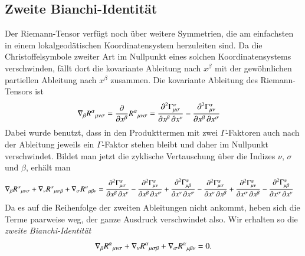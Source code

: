 \subsection{Zweite Bianchi-Identität}
Der Riemann-Tensor verfügt noch über weitere Symmetrien, die am
einfachsten in einem lokalgeodätischen Koordinatensystem herzuleiten sind. 
Da die Christoffelsymbole zweiter Art im Nullpunkt eines solchen
Koordinatensystems verschwinden, fällt dort die kovariante Ableitung
nach $x^\beta$ mit der gewöhnlichen partiellen Ableitung nach $x^\beta$
zusammen.
Die kovariante Ableitung des Riemann-Tensors ist
\begin{align*}
\nabla_\beta
R^\alpha\mathstrut_{\mu\nu\sigma}
&=
\frac{\partial}{\partial x^\beta}
R^\alpha\mathstrut_{\mu\nu\sigma}
=
\frac{\partial^2\Gamma^\alpha_{\mu\sigma}}{\partial x^\beta\,\partial x^\nu}
-
\frac{\partial^2\Gamma^\alpha_{\mu\nu}}{\partial x^\beta\,\partial x^\sigma}
\end{align*}
Dabei wurde benutzt, dass in den Produkttermen mit zwei $\Gamma$-Faktoren
auch nach der Ableitung jeweils ein $\Gamma$-Faktor stehen bleibt und 
daher im Nullpunkt verschwindet.
Bildet man jetzt die zyklische Vertauschung über die Indizes $\nu$,
$\sigma$ und $\beta$, erhält man
\begin{align*}
\nabla_\beta R^\alpha\mathstrut_{\mu\nu\sigma}
+
\nabla_\nu R^\alpha\mathstrut_{\mu\sigma\beta}
+
\nabla_\sigma R^\alpha\mathstrut_{\mu\beta\nu}
&=
\frac{\partial^2\Gamma^\alpha_{\mu\sigma}}{\partial x^\beta\,\partial x^\nu}
-
\frac{\partial^2\Gamma^\alpha_{\mu\nu}}{\partial x^\beta\,\partial x^\sigma}
%
+
%
\frac{\partial^2\Gamma^\alpha_{\mu\beta}}{\partial x^\nu\,\partial x^\sigma}
-
\frac{\partial^2\Gamma^\alpha_{\mu\sigma}}{\partial x^\nu\,\partial x^\beta}
%
+
%
\frac{\partial^2\Gamma^\alpha_{\mu\nu}}{\partial x^\sigma\,\partial x^\beta}
-
\frac{\partial^2\Gamma^\alpha_{\mu\beta}}{\partial x^\sigma\,\partial x^\nu}
\end{align*}
Da es auf die Reihenfolge der zweiten Ableitungen nicht ankommt, heben
sich die Terme paarweise weg, der ganze Ausdruck verschwindet also.
Wir erhalten so die {\em zweite Bianchi-Identität}
\begin{equation}
\nabla_\beta R^\alpha\mathstrut_{\mu\nu\sigma}
+
\nabla_\nu R^\alpha\mathstrut_{\mu\sigma\beta}
+
\nabla_\sigma R^\alpha\mathstrut_{\mu\beta\nu}
=0.
\label{skript:kruemmung:bianchi2}
\end{equation}


